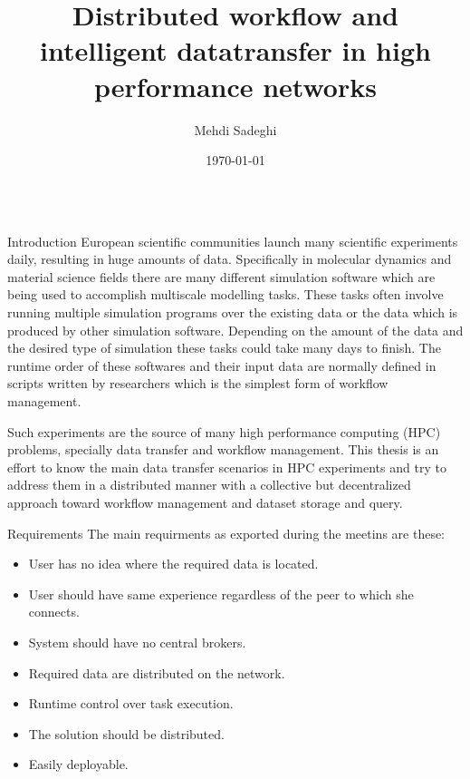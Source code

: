 \documentclass[final,hyperref={pdfpagelabels=true}]{beamer}
\title[Communication and Media Engineering]{Distributed workflow and intelligent datatransfer in high performance networks}
\author[msadeghi@stud.hs-offenburg.de]{Mehdi Sadeghi}
\institute[]{%
  Hochschule für Technik, Wirtschaft und Medien Offenburg\\[0.25\baselineskip]
  Fakultät Medien und Informationswesen\\[0.25\baselineskip]
  Professorin: Dr. Katharina Mehner-Heindl\\[0.25\baselineskip]
  Betreuer: Dr. Adham Hashibon
}
\date[\today]{\today}
\begin{document}
\begin{frame}
  \begin{columns}[t]
    \begin{column}{.45\textwidth}
      \begin{block}{Introduction}
European scientific communities launch many scientific experiments daily, resulting in huge amounts
of data. Specifically in molecular dynamics and material science fields there are many different
simulation software which are being used to accomplish multiscale modelling tasks. These tasks
often involve running multiple simulation programs over the existing data or the data which is
produced by other simulation software. Depending on the amount of the data and the desired type of simulation
these tasks could take many days to finish. The runtime order of these softwares and 
their input data are normally defined in scripts written by researchers which is the simplest
form of workflow management.


Such experiments are the source of many high performance computing (HPC) problems, specially data transfer
and workflow management. This thesis is an effort to know the main data transfer scenarios in HPC experiments 
and try to address them in a distributed manner with a collective but decentralized approach toward workflow management
and dataset storage and query.

      \end{block}
      
      \begin{block}{Requirements}
      The main requirments as exported during the meetins are these:
        \begin{itemize}
        \item User has no idea where the required data is located.
        \item User should have same experience regardless of the peer to which she connects.
        \item System should have no central brokers.
        \item Required data are distributed on the network.
        \item Runtime control over task execution.
        \item The solution should be distributed.
        \item Easily deployable.
        \end{itemize}
      \end{block}
    \end{column}


\end{columns}
\end{frame}
\end{document}

